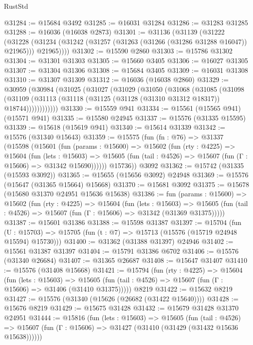 \begin{lexlean}{RustStd}
\begin{coremodule}
@31284 := @15684 @3492
@31285 := @16031 @31284
@31286 := @31283 @31285
@31288 := @16036 (@16038 @2873)
@31301 := @31136
    (@31139
      (@31222
        (@31228 (@31234 (@31242 (@31257 (@31263 (@31266 (@31286 @31288 @16047)) @21965))) @21965))))
@31302 := @15590 @2860
@31303 := @15786 @31302
@31304 := @31301 @31303
@31305 := @15660 @3405
@31306 := @16027 @31305
@31307 := @31304 @31306
@31308 := @15684 @3405
@31309 := @16031 @31308
@31310 := @31307 @31309
@31312 := @16036 (@16038 @2860)
@31329 := @30959
    (@30984
      (@31025
        (@31027
          (@31029
            (@31050
              (@31068
                (@31085
                  (@31098
                    (@31109
                      (@31113 (@31118 (@31125 (@31128 (@31310 @31312 @18317)) @18744))))))))))))
@31330 := @15559 @941
@31334 := @15561 (@15565 @941) (@15571 @941)
@31335 := @15580 @24945
@31337 := @15576 (@31335 @15595)
@31339 := @15618 (@15619 @941)
@31340 := @15614 @31339
@31342 := @15576 (@31340 @15643)
@31359 := @15575
    (fun (fn : @76) =>
    @31337
      (@15598
        (@15601
          (fun (params : @15600) =>
          @15602
            (fun (rty : @4225) =>
            @15604
              (fun (lets : @15603) =>
              @15605 (fun (tail : @4526) => @15607 (fun (Γ : @15606) => @31342 @15690))))))
        @15736))
    @3092
@31362 := @15742 (@31335 (@15593 @3092))
@31365 := @15655 (@15656 @3092) @24948
@31369 := @15576 (@15647 (@31365 @15664) @15668)
@31370 := @15681 @3092
@31375 := @15678 (@15680 @31370 @24951 @15636 @15638)
@31386 := fun (params : @15600) =>
  @15602
    (fun (rty : @4225) =>
    @15604
      (fun (lets : @15603) =>
      @15605 (fun (tail : @4526) => @15607 (fun (Γ : @15606) => @31342 (@31369 @31375)))))
@31387 := @15601 @31386
@31388 := @15598 @31387
@31397 := @15704
    (fun (U : @15703) => @15705 (fun (t : @7) => @15713 (@15576 (@15719 @24948 @15594) @15730)))
@31400 := @31362 (@31388 @31397) @24946
@31402 := @15561 @31387 @31397
@31404 := @15791 @31386 @6702
@31406 := @15576 (@31340 @26684)
@31407 := @31365 @26687
@31408 := @15647 @31407
@31410 := @15576 (@31408 @15668)
@31421 := @15794
    (fun (rty : @4225) =>
    @15604
      (fun (lets : @15603) =>
      @15605 (fun (tail : @4526) => @15607 (fun (Γ : @15606) => @31406 (@31410 @31375)))))
    @8219
@31422 := @15632 @8219
@31427 := @15576 (@31340 (@15626 (@26682 (@31422 @15640))))
@31428 := @15676 @8219
@31429 := @15675 @31428
@31432 := @15679 @31428 @31370 @24951
@31444 := @15816
    (fun (lets : @15603) =>
    @15605
      (fun (tail : @4526) =>
      @15607 (fun (Γ : @15606) => @31427 (@31410 (@31429 (@31432 @15636 @15638))))))

\end{coremodule}
\end{lexlean}
